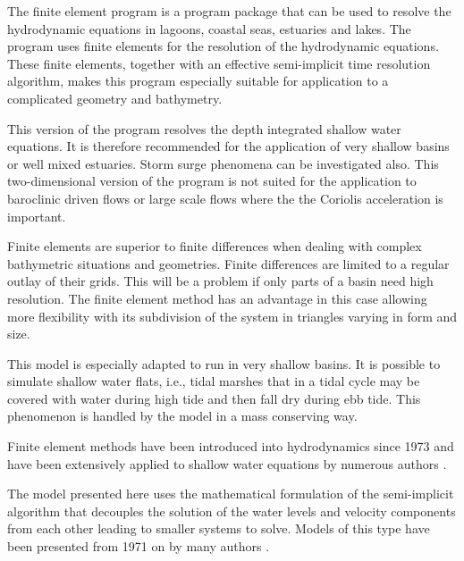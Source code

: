 

The finite element program \shy{} is a program package that can be used
to resolve the hydrodynamic equations in lagoons, coastal seas,
estuaries and lakes. The program uses finite elements for the
resolution of the hydrodynamic equations. These finite elements,
together with an effective semi-implicit time resolution algorithm,
makes this program especially suitable for application to a complicated
geometry and bathymetry.

This version of the program \shy{} resolves the depth integrated
shallow water equations. It is therefore recommended for the
application of very shallow basins or well mixed estuaries. Storm surge
phenomena can be investigated also.  This two-dimensional version of
the program is not suited for the application to baroclinic driven
flows or large scale flows where the the Coriolis acceleration is
important.

Finite elements are superior to finite differences when dealing with
complex bathymetric situations and geometries. Finite differences are
limited to a regular outlay of their grids. This will be a problem if
only parts of a basin need high resolution.  The finite element method
has an advantage in this case allowing more flexibility with its
subdivision of the system in triangles varying in form and size.

This model is especially adapted to run in very shallow basins. It is
possible to simulate shallow water flats, i.e., tidal marshes that in a
tidal cycle may be covered with water during high tide and then fall
dry during ebb tide. This phenomenon is handled by the model in a mass
conserving way.

Finite element methods have been introduced into hydrodynamics since
1973 and have been extensively applied to shallow water equations by
numerous authors \cite{Grotkop73, Taylor75, Herrling77, Herrling78, Holz82}.

The model presented here \cite{Umgies86, Umgies93} uses the mathematical
formulation of the semi-implicit algorithm that decouples the solution
of the water levels and velocity components from each other leading to
smaller systems to solve. Models of this type have been presented from
1971 on by many authors \cite{Kwizak71, Duwe82, Backhaus83}.


